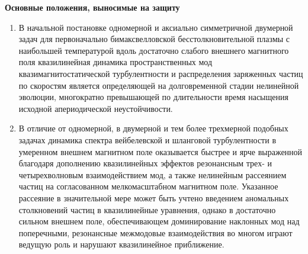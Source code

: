 {\bfseries Основные положения, выносимые на защиту}

\begin{enumerate}
    \item В начальной постановке одномерной и аксиально симметричной двумерной задач для первоначально бимаксвелловской бесстолкновительной плазмы с наибольшей температурой вдоль достаточно слабого внешнего магнитного поля квазилинейная динамика пространственных мод квазимагнитостатической турбулентности и распределения заряженных частиц по скоростям является определяющей на долговременной стадии нелинейной эволюции, многократно превышающей по длительности время насыщения исходной апериодической неустойчивости.

    \item В отличие от одномерной, в двумерной и тем более трехмерной подобных задачах динамика спектра вейбелевской и шланговой турбулентности в умеренном внешнем магнитном поле оказывается быстрее и ярче выраженной благодаря дополнению квазилинейных эффектов резонансным трех- и четырехволновым взаимодействием мод, а также нелинейным рассеянием частиц на согласованном мелкомасштабном магнитном поле. Указанное рассеяние в значительной мере может быть учтено введением аномальных столкновений частиц в квазилинейные уравнения, однако в достаточно сильном внешнем поле, обеспечивающем доминирование наклонных мод над поперечными, резонансные межмодовые взаимодействия во многом играют ведущую роль и нарушают квазилинейное приближение. 


\end{enumerate}
